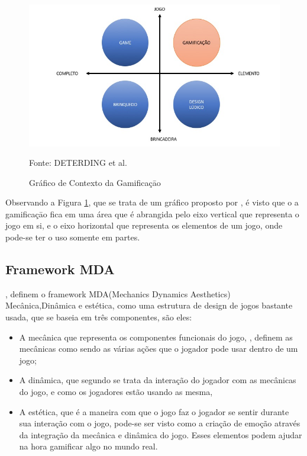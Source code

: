 			\begin{figure}[H]
				\centering
				\includegraphics[width=0.7\linewidth]{img/graficoGamificacao.jpeg}
				\caption{Gráfico de Contexto da Gamificaçāo}
				Fonte: DETERDING et al.
				\label{contextoGami}
			\end{figure}
	Observando a Figura \ref{contextoGami}, que se trata de um gráfico proposto por , é visto que o a gamificaçāo fica em uma área que é abrangida pelo eixo vertical que representa o jogo em si, e o eixo horizontal que representa os elementos de um jogo, onde pode-se ter o uso somente em partes.
	\subsection{Framework MDA}
	 , definem o  framework MDA(Mechanics Dynamics Aesthetics) Mecânica,Dinâmica e estética,  como uma estrutura de design de jogos bastante usada, que se baseia em três componentes, são eles: 
	 \begin{itemize}
	 	\item  A mecânica que representa os componentes funcionais do jogo, , definem as mecânicas como sendo as várias ações que o jogador pode usar dentro de um jogo;
	 	
	 	\item A dinâmica, que segundo   se trata da interação do jogador  com as mecânicas do jogo, e como os jogadores estão usando as mesma, 
	 	
	 	\item A estética, que é a maneira com que o jogo faz o jogador se sentir durante sua interação com o jogo, pode-se ser visto como a criação de emoção através da integração da mecânica e dinâmica do jogo. Esses elementos podem ajudar na hora gamificar algo no mundo real.
	 \end{itemize}
	
